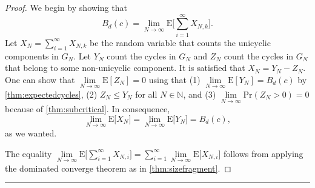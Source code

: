 \documentclass[11pt,notitlepage,a4paper]{article}
\theoremstyle{definition}
\newcommand{\N}{\mathbb{N}}
\newcommand{\LN}{\lim\limits_{N\to \infty}}
\begin{document}
	\begin{proof}
	We begin by showing that
	\begin{equation} \label{eqn:cyclesunicycles}
		B_d(c)=\LN \mathrm{E}\big[\sum_{i=1}^\infty X_{N,k}].
	\end{equation}
	Let $X_N=\sum_{i=1}^{\infty} X_{N,k}$ be the random variable
	that counts the unicyclic components in $G_N$. Let $Y_N$ count
	the cycles in $G_N$ and $Z_N$ count the cycles in $G_N$ that 
	belong to some non-unicyclic component. It is satisfied that 
	$X_N=Y_N-Z_N$. One can show that $\LN \mathrm{E}[Z_N]=0$ using that 
	(1) $\LN \mathrm{E}[Y_N]=B_d(c)$
	by \cref{thm:expectedcycles}, (2) $Z_N\leq Y_N$ for all $N\in \N$, and
	(3)	$\LN \mathrm{Pr}(Z_N>0)=0$ because of \cref{thm:subcritical}. 
	In consequence,
	\[
	 \LN \mathrm{E}\big[X_N\big]=\LN \mathrm{E}\big[Y_N\big]=B_d(c),
	\]
	as we wanted. 
	\par
%	
	The equality $\LN \mathrm{E}\big[\sum_{i=1}^\infty X_{N,i} \big]	
	= \sum_{i=1}^\infty \LN \mathrm{E}\big[ X_{N,i} \big]$
	follows from applying the dominated converge theorem as in 
	\cref{thm:sizefragment}.
	\end{proof}
		\noindent\rule{2cm}{0.4pt}\par
	
\end{document}
